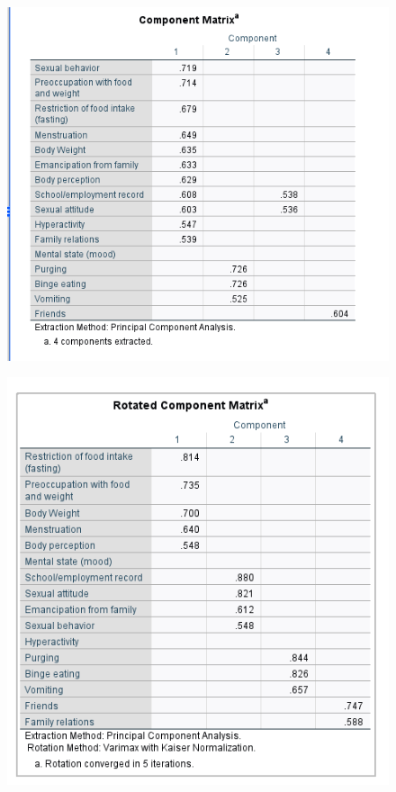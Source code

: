 \documentclass[english,10pt,a4paper]{article}
\begin{document}
\begin{figure}
	\includegraphics[width=1\linewidth]{component matrix.png}
\end{figure}


\begin{figure}
	
	\includegraphics[width=1\linewidth]{Rotated components matrix.png}
	
	
\end{figure}
\end{document}
